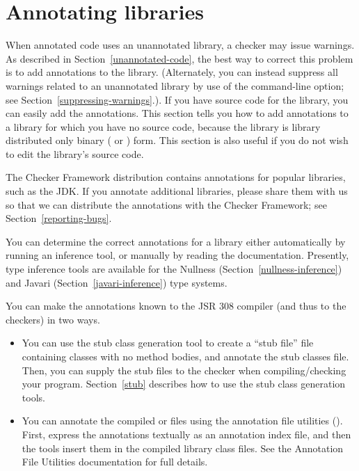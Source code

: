 \htmlhr
\chapter{Annotating libraries\label{annotating-libraries}}

When annotated code uses an unannotated library, a checker may issue warnings.
As described in Section~\ref{unannotated-code}, the best way to correct
this problem is to add annotations to the library.  (Alternately, you can instead
suppress all warnings related to an unannotated library by use of the 
 command-line option; see
Section~\ref{suppressing-warnings}.).  If you have source code for the
library, you can easily add the annotations.
This section tells you
how to add annotations to a library for which you have no source code,
because the library is library distributed only binary ( or
) form.  This section is also useful if you do not wish to edit the
library's source code.

The Checker Framework distribution contains annotations
for popular libraries, such as the JDK\@.
If you annotate additional libraries, please share them with us so that we
can distribute the annotations with the Checker Framework; see
Section~\ref{reporting-bugs}.


You can determine the correct annotations for a library either
automatically by running an inference tool, or manually by reading the
documentation.  Presently, type inference tools are available for the
Nullness (Section~\ref{nullness-inference}) and Javari
(Section~\ref{javari-inference}) type systems.

You can make the annotations known to the JSR 308 compiler (and thus
to the checkers) in two ways.

\begin{itemize}

\item You can use the stub class generation tool to create a ``stub
  file'' file containing classes with no method bodies,
  and annotate the stub classes
  file.  Then, you can supply the stub files to the checker when
  compiling/checking your program.
  Section~\ref{stub} describes how to use the stub class generation
  tools.

\item You can annotate the compiled
   or  files using the annotation file utilities
  ().
  First, express the annotations textually as an annotation index file, and
  then the tools insert them in the compiled library class files.
  See the Annotation File Utilities documentation for full details.

\end{itemize}


